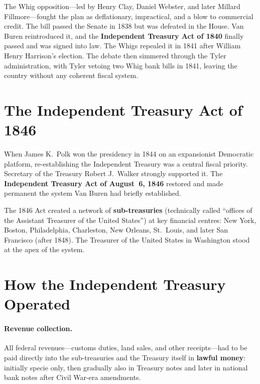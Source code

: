 \documentclass[12pt]{article}
\begin{document}
The Whig opposition---led by Henry Clay, Daniel Webster, and later
Millard Fillmore---fought the plan as deflationary, impractical, and a
blow to commercial credit.  The bill passed the Senate in 1838 but was
defeated in the House.  Van Buren reintroduced it, and the
\textbf{Independent Treasury Act of 1840} finally passed and was signed
into law.  The Whigs repealed it in 1841 after William Henry Harrison's
election.  The debate then simmered through the Tyler administration,
with Tyler vetoing two Whig bank bills in 1841, leaving the country
without any coherent fiscal system.

\section{The Independent Treasury Act of 1846}

When James K.\ Polk won the presidency in 1844 on an expansionist
Democratic platform, re-establishing the Independent Treasury was a
central fiscal priority.  Secretary of the Treasury Robert J.\ Walker
strongly supported it.  The \textbf{Independent Treasury Act of
August~6, 1846} restored and made permanent the system Van Buren had
briefly established.

The 1846 Act created a network of \textbf{sub-treasuries} (technically
called ``offices of the Assistant Treasurer of the United States'') at
key financial centres: New York, Boston, Philadelphia, Charleston, New
Orleans, St.\ Louis, and later San Francisco (after 1848).  The
Treasurer of the United States in Washington stood at the apex of the
system.

\section{How the Independent Treasury Operated}

\paragraph{Revenue collection.}
All federal revenues---customs duties, land sales, and other
receipts---had to be paid directly into the sub-treasuries and the
Treasury itself in \textbf{lawful money}: initially specie only, then
gradually also in Treasury notes and later in national bank notes after
Civil War-era amendments.
\end{document}
